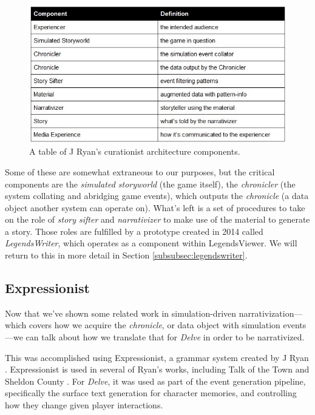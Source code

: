 
\begin{figure}
    \centering
    \includegraphics[width=\textwidth]{figures/4-Delve/curationist-architecture-components.jpg}
    \caption{A table of J Ryan's curationist architecture components.}
    \label{fig:curationist-architecture-components}
\end{figure}


Some of these are somewhat extraneous to our purposes, but the critical components are the \textit{simulated storyworld} (the game itself), the \textit{chronicler} (the system collating and abridging game events), which outputs the \textit{chronicle} (a data object another system can operate on). What's left is a set of procedures to take on the role of \textit{story sifter} and \textit{narrativizer} to make use of the material to generate a story. Those roles are fulfilled by a prototype created in 2014 called \textit{LegendsWriter}, which operates as a component within LegendsViewer. We will return to this in more detail in Section \ref{subsubsec:legendswriter}.

\subsection{Expressionist}
\label{subsec:expressionist}

Now that we've shown some related work in simulation-driven narrativization---which covers how we acquire the \textit{chronicle}, or data object with simulation events---we can talk about how we translate that for \textit{Delve} in order to be narrativized.

This was accomplished using Expressionist, a grammar system created by J Ryan \cite{ryan2016expressionist}. Expressionist is used in several of Ryan's works, including Talk of the Town \cite{ryan2016characters} and Sheldon County \cite[p.~647-681]{ryan2018curating}. For \textit{Delve}, it was used as part of the event generation pipeline, specifically the surface text generation for character memories, and controlling how they change given player interactions.

